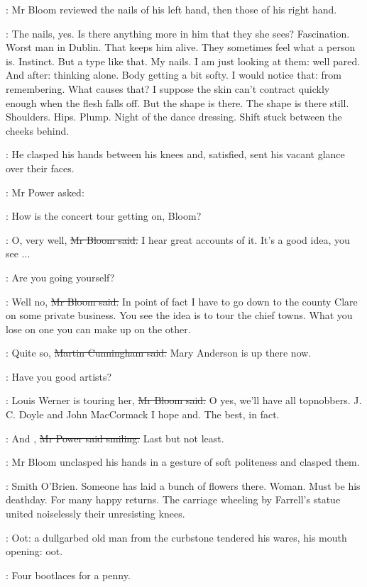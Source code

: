 :
Mr Bloom reviewed the nails of his left hand,
then those of his right hand.

\BloomInt:
The nails, yes.
Is there anything more in him that they she sees?
Fascination.
Worst man in Dublin.
That keeps him alive.
They sometimes feel what a person is.
Instinct.
But a type like that.
My nails.
I am just looking at them:
well pared.
And after:
thinking alone.
Body getting a bit softy.
I would notice that:
from remembering.
What causes that?
I suppose the skin can't contract quickly enough when the flesh falls off.
But the shape is there.
The shape is there still.
Shoulders.
Hips.
Plump.
Night of the dance dressing.
Shift stuck between the cheeks behind.

:
He clasped his hands between his knees
and, satisfied, sent his vacant glance over their faces.

:
Mr Power asked:

\power:
How is the concert tour getting on, Bloom?

\Bloom:
O, very well,
\sout{Mr Bloom said.}
I hear great accounts of it.
It's a good idea, you see ...

\power:
Are you going yourself?

\Bloom:
Well no,
\sout{Mr Bloom said.}
In point of fact
I have to go down to the county Clare on some private business.
You see the idea is to tour the chief towns.
What you lose on one
you can make up on the other.

\cunningham:
Quite so,
\sout{Martin Cunningham said.}
Mary Anderson is up there now.

\power:
Have you good artists?

\Bloom:
Louis Werner is touring her,
\sout{Mr Bloom said.}
O yes, we'll have all topnobbers.
J. C. Doyle and John MacCormack I hope and.
The best, in fact.

\power:
And ,
\sout{Mr Power said smiling.}
Last but not least.

:
Mr Bloom unclasped his hands in a gesture of soft politeness and clasped them.

\BloomInt:
Smith O'Brien.
Someone has laid a bunch of flowers there.
Woman.
Must be his deathday.
For many happy returns.
The carriage wheeling by Farrell's statue
united noiselessly their unresisting knees.

:
Oot:
a dullgarbed old man from the curbstone tendered his wares,
his mouth opening:
oot.

\man:
Four bootlaces for a penny.

